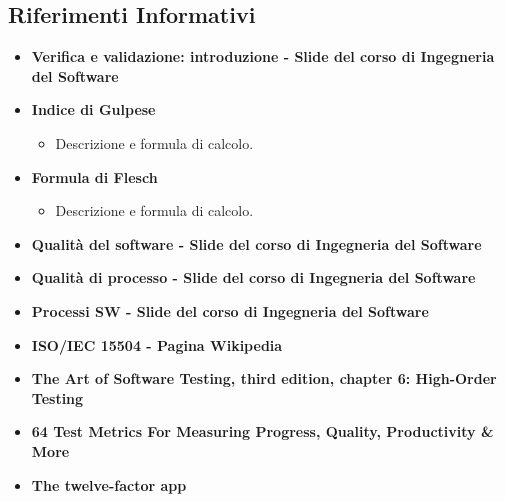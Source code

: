 \documentclass[PianoDiQualifica.tex]{subfiles}
\begin{document}
		\subsection{Riferimenti Informativi}
		\begin{itemize}
			\item \textbf{Verifica e validazione: introduzione - Slide del corso di Ingegneria del Software}\\
			\item \textbf{Indice di Gulpese}\\
			\begin{itemize}
				\item Descrizione e formula di calcolo.
			\end{itemize}
			\item \textbf{Formula di Flesch}\\
			\begin{itemize}
				\item Descrizione e formula di calcolo.
			\end{itemize}
			\item \textbf{Qualità del software - Slide del corso di Ingegneria del Software}\\
			\item \textbf{Qualità di processo - Slide del corso di Ingegneria del Software}\\
			\item \textbf{Processi SW - Slide del corso di Ingegneria del Software}\\
			\item \textbf{ISO/IEC 15504 - Pagina Wikipedia}\\
			\item \textbf{The Art of Software Testing, third edition, chapter 6: High-Order Testing} \\
			\item \textbf{64 Test Metrics For Measuring Progress, Quality, Productivity \& More}\\
			\item \textbf{The twelve-factor app}\\
		\end{itemize}
	
\end{document}
